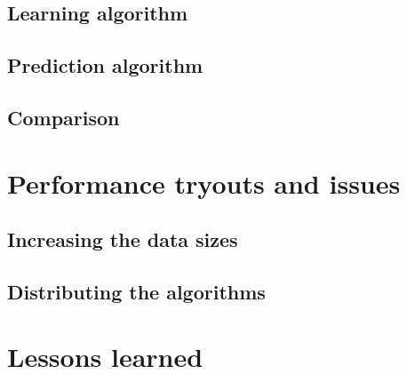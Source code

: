\documentclass[a4paper,12pt]{article}
\begin{document}

  \subsection{Learning algorithm}

  \subsection{Prediction algorithm}

  \subsection{Comparison}


\section{Performance tryouts and issues}

  \subsection{Increasing the data sizes}

  \subsection{Distributing the algorithms}

\section*{Lessons learned}

  \lipsum[8-9]
\end{document}
